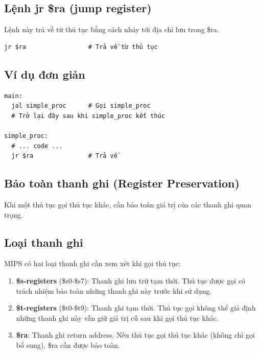 \subsection{Lệnh jr \$ra (jump register)}

Lệnh này trả về từ thủ tục bằng cách nhảy tới địa chỉ lưu trong \$ra.

\begin{verbatim}
jr $ra                 # Trả về từ thủ tục
\end{verbatim}

\subsection{Ví dụ đơn giản}

\begin{verbatim}
main:
  jal simple_proc      # Gọi simple_proc
  # Trở lại đây sau khi simple_proc kết thúc
  
simple_proc:
  # ... code ...
  jr $ra               # Trả về
\end{verbatim}

\subsection{Bảo toàn thanh ghi (Register Preservation)}

Khi một thủ tục gọi thủ tục khác, cần bảo toàn giá trị của các thanh ghi quan trọng.

\subsection{Loại thanh ghi}

MIPS có hai loại thanh ghi cần xem xét khi gọi thủ tục:

\begin{enumerate}
    \item \textbf{\$s-registers} (\$s0-\$s7): Thanh ghi lưu trữ tạm thời. Thủ tục được gọi có trách nhiệm bảo toàn những thanh ghi này trước khi sử dụng.
    
    \item \textbf{\$t-registers} (\$t0-\$t9): Thanh ghi tạm thời. Thủ tục gọi không thể giả định những thanh ghi này vẫn giữ giá trị cũ sau khi gọi thủ tục khác.
    
    \item \textbf{\$ra}: Thanh ghi return address. Nếu thủ tục gọi thủ tục khác (không chỉ gọi bổ sung), \$ra cần được bảo toàn.
\end{enumerate}

